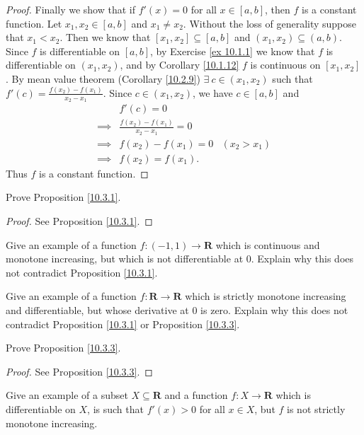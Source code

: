 \begin{proof}
    Finally we show that if \(f'(x) = 0\) for all \(x \in [a, b]\), then \(f\) is a constant function.
    Let \(x_1, x_2 \in [a, b]\) and \(x_1 \neq x_2\).
    Without the loss of generality suppose that \(x_1 < x_2\).
    Then we know that \([x_1, x_2] \subseteq [a, b]\) and \((x_1, x_2) \subseteq (a, b)\).
    Since \(f\) is differentiable on \([a, b]\), by Exercise \ref{ex 10.1.1} we know that \(f\) is differentiable on \((x_1, x_2)\), and by Corollary \ref{10.1.12} \(f\) is continuous on \([x_1, x_2]\).
    By mean value theorem (Corollary \ref{10.2.9}) \(\exists\ c \in (x_1, x_2)\) such that \(f'(c) = \frac{f(x_2) - f(x_1)}{x_2 - x_1}\).
    Since \(c \in (x_1, x_2)\), we have \(c \in [a, b]\) and
    \begin{align*}
                 & f'(c) = 0                                           \\
        \implies & \frac{f(x_2) - f(x_1)}{x_2 - x_1} = 0               \\
        \implies & f(x_2) - f(x_1) = 0                   & (x_2 > x_1) \\
        \implies & f(x_2) = f(x_1).
    \end{align*}
    Thus \(f\) is a constant function.
\end{proof}

\exercisesection

\begin{exercise}\label{ex 10.3.1}
    Prove Proposition \ref{10.3.1}.
\end{exercise}

\begin{proof}
    See Proposition \ref{10.3.1}.
\end{proof}

\begin{exercise}\label{ex 10.3.2}
    Give an example of a function \(f : (-1, 1) \to \mathbf{R}\) which is continuous and monotone increasing, but which is not differentiable at \(0\).
    Explain why this does not contradict Proposition \ref{10.3.1}.
\end{exercise}

\begin{exercise}\label{ex 10.3.3}
    Give an example of a function \(f : \mathbf{R} \to \mathbf{R}\) which is strictly monotone increasing and differentiable, but whose derivative at \(0\) is zero.
    Explain why this does not contradict Proposition \ref{10.3.1} or Proposition \ref{10.3.3}.
\end{exercise}

\begin{exercise}\label{ex 10.3.4}
    Prove Proposition \ref{10.3.3}.
\end{exercise}

\begin{proof}
    See Proposition \ref{10.3.3}.
\end{proof}

\begin{exercise}\label{ex 10.3.5}
    Give an example of a subset \(X \subseteq \mathbf{R}\) and a function \(f : X \to \mathbf{R}\) which is differentiable on \(X\), is such that \(f'(x) > 0\) for all \(x \in X\), but \(f\) is not strictly monotone increasing.
\end{exercise}